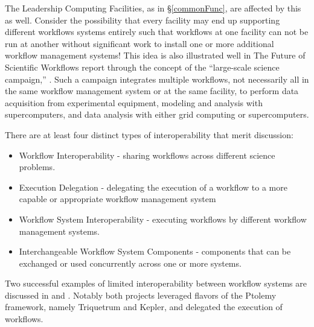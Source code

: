 The Leadership Computing Facilities, as in \S\ref{commonFunc}, are affected by this as well. Consider the possibility that every facility may end up supporting different workflows systems entirely such that workflows at one facility can not be run at another without significant work to install one or more additional workflow management systems! This idea is also illustrated well in The Future of Scientific Workflows report through the concept of the ``large-scale science campaign,'' \cite{deelman_future_2015}. Such a campaign integrates multiple workflows, not necessarily all in the same workflow management system or at the same facility, to perform data acquisition from experimental equipment, modeling and analysis with supercomputers, and data analysis with either grid computing or supercomputers.

There are at least four distinct types of interoperability that merit discussion:
\begin{itemize}
\item Workflow Interoperability - sharing workflows across different science problems.
\item Execution Delegation - delegating the execution of a workflow to a more capable or appropriate workflow management system
\item Workflow System Interoperability - executing workflows by different workflow management systems.
\item Interchangeable Workflow System Components - components that can be exchanged or used concurrently across one or more systems.
\end{itemize}
Two successful examples of limited interoperability between workflow systems are discussed in \cite{brooks_triquetrum:_2015} and \cite{mandal_integrating_2007}. Notably both projects leveraged flavors of the Ptolemy framework, namely Triquetrum and Kepler, and delegated the execution of workflows.